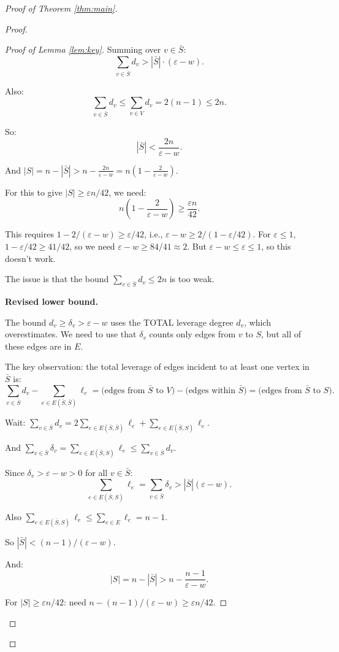 \documentclass[12pt]{article}
\begin{document}
\begin{proof}[Proof of Theorem \ref{thm:main}]
\begin{proof}
\begin{proof}[Proof of Lemma \ref{lem:key}]
Summing over $v \in \bar{S}$:
\[
\sum_{v \in \bar{S}} d_v > |\bar{S}| \cdot (\varepsilon - w).
\]

Also:
\[
\sum_{v \in \bar{S}} d_v \leq \sum_{v \in V} d_v = 2(n-1) \leq 2n.
\]

So:
\[
|\bar{S}| < \frac{2n}{\varepsilon - w}.
\]

And $|S| = n - |\bar{S}| > n - \frac{2n}{\varepsilon - w} = n\left(1 - \frac{2}{\varepsilon - w}\right)$.

For this to give $|S| \geq \varepsilon n / 42$, we need:
\[
n\left(1 - \frac{2}{\varepsilon - w}\right) \geq \frac{\varepsilon n}{42}.
\]

This requires $1 - 2/(\varepsilon - w) \geq \varepsilon/42$, i.e., $\varepsilon - w \geq 2/(1 - \varepsilon/42)$. For $\varepsilon \leq 1$, $1 - \varepsilon/42 \geq 41/42$, so we need $\varepsilon - w \geq 84/41 \approx 2$. But $\varepsilon - w \leq \varepsilon \leq 1$, so this doesn't work.

The issue is that the bound $\sum_{v \in \bar{S}} d_v \leq 2n$ is too weak.

\textbf{Revised lower bound.}

The bound $d_v \geq \delta_v > \varepsilon - w$ uses the TOTAL leverage degree $d_v$, which overestimates. We need to use that $\delta_v$ counts only edges from $v$ to $S$, but all of these edges are in $E$.

The key observation: the total leverage of edges incident to at least one vertex in $\bar{S}$ is:
\[
\sum_{v \in \bar{S}} d_v - \sum_{e \in E(\bar{S},\bar{S})} \ell_e = \text{(edges from }\bar{S}\text{ to }V) - \text{(edges within }\bar{S}) = \text{(edges from }\bar{S}\text{ to }S).
\]

Wait: $\sum_{v \in \bar{S}} d_v = 2 \sum_{e \in E(\bar{S},\bar{S})} \ell_e + \sum_{e \in E(\bar{S},S)} \ell_e$.

And $\sum_{v \in \bar{S}} \delta_v = \sum_{e \in E(\bar{S},S)} \ell_e \leq \sum_{v \in \bar{S}} d_v$.

Since $\delta_v > \varepsilon - w > 0$ for all $v \in \bar{S}$:
\[
\sum_{e \in E(\bar{S},S)} \ell_e = \sum_{v \in \bar{S}} \delta_v > |\bar{S}|(\varepsilon - w).
\]

Also $\sum_{e \in E(\bar{S},S)} \ell_e \leq \sum_{e \in E} \ell_e = n-1$.

So $|\bar{S}| < (n-1)/(\varepsilon - w)$.

And:
\[
|S| = n - |\bar{S}| > n - \frac{n-1}{\varepsilon - w}.
\]

For $|S| \geq \varepsilon n / 42$: need $n - (n-1)/(\varepsilon-w) \geq \varepsilon n / 42$.


\end{proof}
\end{proof}
\end{proof}
\end{document}
